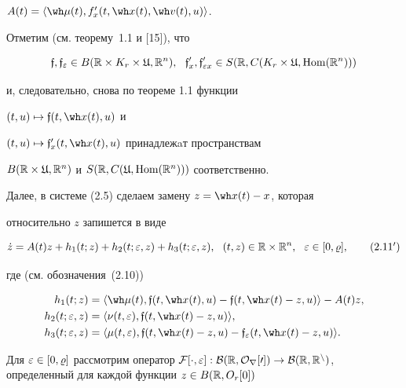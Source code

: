 $A(t)=\la\wh\mu(t),f_x'(t,\wh x(t), \wh v(t),u)\ra$.


Отметим (см. теорему~1.1 и [15]), что


\begin{equation}


\frak{f},\frak{f}_{\ve}\in B(\R\times K_r\times\gU,\R^n), \ \


\frak{f}_x',\frak{f}_{\ve x}'\in S(\R,C(K_r\times\gU,\Hom(\R^n)))


\end{equation}


и, следовательно, снова по теореме 1.1 функции


$(t,u)\mapsto\frak{f}(t,\wh x(t),u)$ и


$(t,u)\mapsto {\frak{f}}_x'(t,\wh x(t),u)$ принадлежaт пространствам


$B(\Bbb R\times\frak U,\Bbb R^n)$ и $S(\Bbb R,C(\frak U,\operatorname{Hom}(\Bbb R^n)))$ соответственно.





Далее, в системе (2.5) сделаем замену $z=\wh x(t)-x$, которая


относительно $z$ запишется в виде


\begin{equation}


\Dot z=A(t)z+h_1(t;z)+h_2(t;\ve,z)+h_3(t;\ve,z),\ \


(t,z)\in\R\times\R^n,\ \ \ve\in[0,\vr], \tag{2.11$'$}


\end{equation}


где (см. обозначения~(2.10))


\begin{align*}


h_1(t;z)&=\la \wh\mu(t),\frak{f}(t,\wh x(t),u)-


\frak{f}(t,\wh x(t)-z,u) \ra-A(t)z,\\


h_2(t;\ve,z)&=\la \nu(t,\ve), \frak{f}(t,\wh x(t)-z,u) \ra, \\


h_3(t;\ve,z)&=\la \mu(t,\ve), \frak{f}(t,\wh x(t)-z,u) -


\frak{f}_{\ve}(t,\wh x(t)-z,u)\ra.


\end{align*}


Для $\ve\in[0,\vr]$ рассмотрим оператор $\cal F[\cdot,\ve]: B(\R,O_r[0])


\to B(\R,\R^n)$, определенный для каждой функции $z\in B(\R,O_r[0])$


